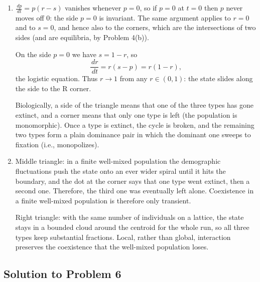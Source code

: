 \documentclass[a4paper,12pt]{article}
\newcommand{\dd}{\,d}
\begin{document}
\begin{enumerate}[label=(\alph*)]
If R becomes rare, then $r$ is small, so by the rule the trajectory comes close to the side opposite the R corner, that is, to the side joining the S and P corners.

\item $\frac{\dd p}{\dd t} = p\left( r-s \right)$ vanishes whenever $p=0$, so if $p=0$ at $t=0$ then $p$ never moves off $0$: the side $p=0$ is invariant. The same argument applies to $r=0$ and to $s=0$, and hence also to the corners, which are the intersections of two sides (and are equilibria, by Problem 4(b)).

On the side $p=0$ we have $s=1-r$, so
\[ \frac{\dd r}{\dd t} = r\left( s-p \right) = r\left( 1-r \right) , \]
the logistic equation. Thus $r \to 1$ from any $r \in \left( 0,1 \right)$: the state slides along the side to the R corner.

Biologically, a side of the triangle means that one of the three types has gone extinct, and a corner means that only one type is left (the population is monomorphic). Once a type is extinct, the cycle is broken, and the remaining two types form a plain dominance pair in which the dominant one sweeps to fixation (i.e., monopolizes).

\item Middle triangle: in a finite well-mixed population the demographic fluctuations push the state onto an ever wider spiral until it hits the boundary, and the dot at the corner says that one type went extinct, then a second one. Therefore, the third one was eventually left alone. Coexistence in a finite well-mixed population is therefore only transient.

Right triangle: with the same number of individuals on a lattice, the state stays in a bounded cloud around the centroid for the whole run, so all three types keep substantial fractions. Local, rather than global, interaction preserves the coexistence that the well-mixed population loses.
\end{enumerate}

\subsection*{Solution to Problem 6}
\end{document}
